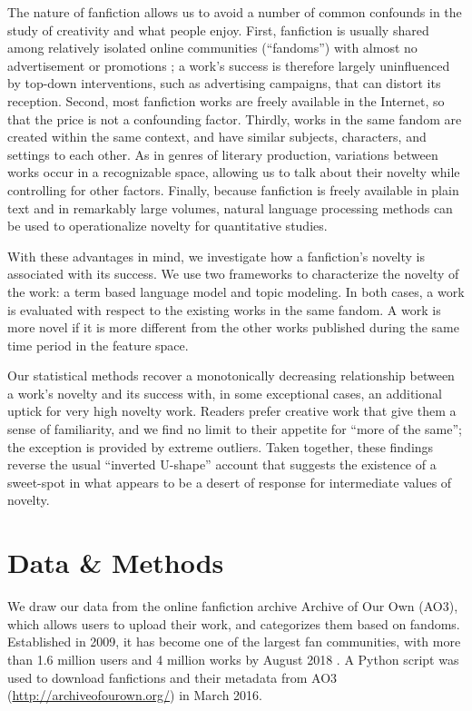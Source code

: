 \documentclass[letterpaper]{article} %
\begin{document}
The nature of fanfiction allows us to avoid a number of common confounds in the study of creativity and what people enjoy. First, fanfiction is usually shared among relatively isolated online communities (``fandoms'') with almost no advertisement or promotions \cite{wiki:fandom}; a work's success is therefore largely uninfluenced by top-down interventions, such as advertising campaigns, that can distort its reception. Second, most fanfiction works are freely available in the Internet, so that the price is not a confounding factor. Thirdly, works in the same fandom are created within the same context, and have similar subjects, characters, and settings to each other. As in genres of literary production, variations between works occur in a recognizable space, allowing us to talk about their novelty while controlling for other factors. Finally, because fanfiction is freely available in plain text and in remarkably large volumes, natural language processing methods can be used to operationalize novelty for quantitative studies. 

With these advantages in mind, we investigate how a fanfiction's novelty is associated with its success. We use two frameworks to characterize the novelty of the work: a term based language model and topic modeling. In both cases, a work is evaluated with respect to the existing works in the same fandom. A work is more novel if it is more different from the other works published during the same time period in the feature space. 

Our statistical methods recover a monotonically decreasing relationship between a work's novelty and its success with, in some exceptional cases, an additional uptick for very high novelty work. Readers prefer creative work that give them a sense of familiarity, and we find no limit to their appetite for ``more of the same''; the exception is provided by extreme outliers. Taken together, these findings reverse the usual ``inverted  U-shape'' account that suggests the existence of a sweet-spot in what appears to be a desert of response for intermediate values of novelty.

\section*{Data \& Methods}

We draw our data from the online fanfiction archive Archive of Our Own (AO3), which allows users to upload their work, and categorizes them based on fandoms. Established in 2009, it has become one of the largest fan communities, with more than 1.6 million users and 4 million works by August 2018 \cite{ao3stats}. A Python script was used to download fanfictions and their metadata from AO3 (\url{http://archiveofourown.org/}) in March 2016. 
\end{document}
